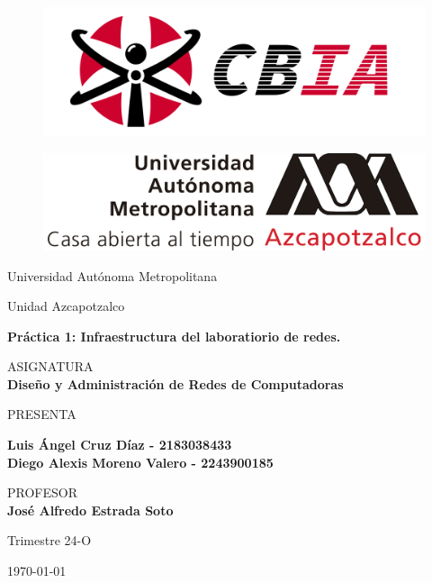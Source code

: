
\begin{figure}[ht]
    \centering %
    \begin{minipage}{0.45\textwidth} %
        \includegraphics[width=\textwidth]{img/portada/CBI.png}
        \label{CBI}
    \end{minipage}\hfill %
    \begin{minipage}{0.45\textwidth}
        \includegraphics[width=\textwidth]{img/portada/UAM.png}
        \label{UAM}
    \end{minipage}
\end{figure}


\begin{center}
\vspace{0.8cm}
\LARGE
Universidad Autónoma Metropolitana

\vspace{0.8cm}
\LARGE
Unidad Azcapotzalco

\vspace{1.7cm}
\Large
\textbf{Práctica 1:  Infraestructura del laboratiorio de redes.}

\vspace{1.3cm}
\normalsize	
ASIGNATURA \\
\vspace{.3cm}
\large
\textbf{Diseño y Administración de Redes de Computadoras}

\vspace{1.3cm}
\normalsize
PRESENTA \\
\vspace{.3cm}
\large

\textbf{Luis Ángel Cruz Díaz - 2183038433\\}
\textbf{Diego Alexis Moreno Valero - 2243900185}

\vspace{1.3cm}
\normalsize	
PROFESOR \\
\vspace{.3cm}
\large
\textbf{José Alfredo Estrada Soto}

\vspace{1.3cm}
\large
Trimestre 24-O

\vspace{1.3cm}
\today
\end{center}

\thispagestyle{empty} 
\newpage